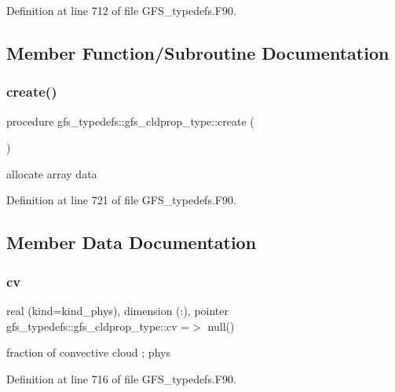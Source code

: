 Definition at line 712 of file G\+F\+S\+\_\+typedefs.\+F90.



\subsection{Member Function/\+Subroutine Documentation}
\mbox{\label{structgfs__typedefs_1_1gfs__cldprop__type_ad1bb87fd24b0397ed4afffd60ba6b1ab}} 
\subsubsection{create()}
{\footnotesize\ttfamily procedure gfs\+\_\+typedefs\+::gfs\+\_\+cldprop\+\_\+type\+::create (\begin{DoxyParamCaption}{ }\end{DoxyParamCaption})}



allocate array data 



Definition at line 721 of file G\+F\+S\+\_\+typedefs.\+F90.



\subsection{Member Data Documentation}
\mbox{\label{structgfs__typedefs_1_1gfs__cldprop__type_a6f9b4d08f86cb458014f659ed2ee9ee9}} 
\subsubsection{cv}
{\footnotesize\ttfamily real (kind=kind\+\_\+phys), dimension  (\+:), pointer gfs\+\_\+typedefs\+::gfs\+\_\+cldprop\+\_\+type\+::cv =$>$ null()}



fraction of convective cloud ; phys 



Definition at line 716 of file G\+F\+S\+\_\+typedefs.\+F90.

\mbox{\label{structgfs__typedefs_1_1gfs__cldprop__type_a7461a33a9e52c6a3a2ab8269b734dce8}} 
